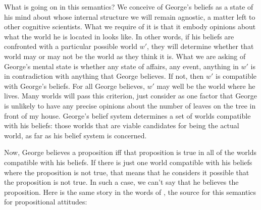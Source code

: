 What %
%
is going on in this semantics? We conceive of George's beliefs as a state of his
mind about whose internal structure we will remain agnostic, a matter left to
other cognitive scientists. What we require of it is that it embody opinions
about what the world he is located in looks like. In other words, if his beliefs
are confronted with a particular possible world $w'$, they will determine
whether that world may or may not be the world as they think it is. What we are
asking of George's mental state is whether any state of affairs, any event,
anything in $w'$ is in contradiction with anything that George believes. If not,
then $w'$ is compatible with George's beliefs. For all George believes, $w'$ may
well be the world where he lives. Many worlds will pass this criterion, just
consider as one factor that George is unlikely to have any precise opinions
about the number of leaves on the tree in front of my house. George's belief
system determines a set of worlds compatible with his beliefs: those worlds that
are viable candidates for being the actual world, as far as his belief system is
concerned.

Now, George believes a proposition iff that proposition is true in all of the
worlds compatible with his beliefs. If there is just one world compatible with
his beliefs where the proposition is not true, that means that he considers it
possible that the proposition is not true. In such a case, we can't say that he
believes the proposition. Here is the same story in the words of
\citet{hintikka:1969:attitudes}, the source for this semantics for propositional
attitudes:


